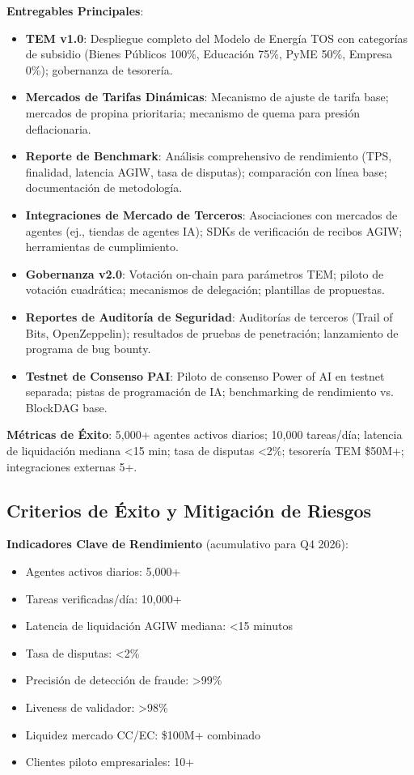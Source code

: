 \documentclass[11pt]{article}
\begin{document}
\textbf{Entregables Principales}:
\begin{itemize}[noitemsep]
  \item \textbf{TEM v1.0}: Despliegue completo del Modelo de Energía TOS con categorías de subsidio (Bienes Públicos 100\%, Educación 75\%, PyME 50\%, Empresa 0\%); gobernanza de tesorería.
  \item \textbf{Mercados de Tarifas Dinámicas}: Mecanismo de ajuste de tarifa base; mercados de propina prioritaria; mecanismo de quema para presión deflacionaria.
  \item \textbf{Reporte de Benchmark}: Análisis comprehensivo de rendimiento (TPS, finalidad, latencia AGIW, tasa de disputas); comparación con línea base; documentación de metodología.
  \item \textbf{Integraciones de Mercado de Terceros}: Asociaciones con mercados de agentes (ej., tiendas de agentes IA); SDKs de verificación de recibos AGIW; herramientas de cumplimiento.
  \item \textbf{Gobernanza v2.0}: Votación on-chain para parámetros TEM; piloto de votación cuadrática; mecanismos de delegación; plantillas de propuestas.
  \item \textbf{Reportes de Auditoría de Seguridad}: Auditorías de terceros (Trail of Bits, OpenZeppelin); resultados de pruebas de penetración; lanzamiento de programa de bug bounty.
  \item \textbf{Testnet de Consenso PAI}: Piloto de consenso Power of AI en testnet separada; pistas de programación de IA; benchmarking de rendimiento vs. BlockDAG base.
\end{itemize}

\textbf{Métricas de Éxito}: 5,000+ agentes activos diarios; 10,000 tareas/día; latencia de liquidación mediana <15 min; tasa de disputas <2\%; tesorería TEM \$50M+; integraciones externas 5+.

\subsection{Criterios de Éxito y Mitigación de Riesgos}

\textbf{Indicadores Clave de Rendimiento} (acumulativo para Q4 2026):
\begin{itemize}[noitemsep]
  \item Agentes activos diarios: 5,000+
  \item Tareas verificadas/día: 10,000+
  \item Latencia de liquidación AGIW mediana: <15 minutos
  \item Tasa de disputas: <2\%
  \item Precisión de detección de fraude: >99\%
  \item Liveness de validador: >98\%
  \item Liquidez mercado CC/EC: \$100M+ combinado
  \item Clientes piloto empresariales: 10+
\end{itemize}
\end{document}
